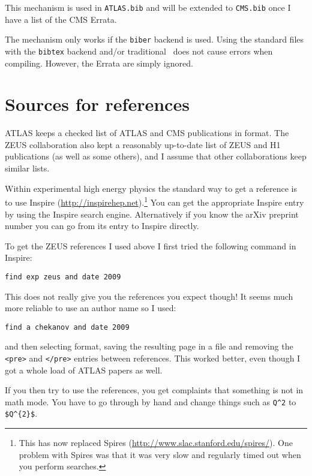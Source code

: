 This mechanism is used in \texttt{ATLAS.bib} and will be extended to \texttt{CMS.bib} once
I have a list of the CMS Errata.

The mechanism only works if the \texttt{biber} backend is used.
Using the standard files with the \texttt{bibtex} backend and/or traditional \BibTeX\ does not cause errors when compiling.
However, the Errata are simply ignored.


\section{Sources for references}
\label{sec:ref:sources}

ATLAS keeps a checked list of ATLAS and CMS publications in \BibTeX{} format. 
The ZEUS collaboration also kept a reasonably up-to-date list of ZEUS and
H1 publications (as well as some others),
and I assume that other collaborations keep similar lists.

Within experimental high energy physics the standard way to get a
reference is to use Inspire
(\url{http://inspirehep.net}).\footnote{This has now replaced Spires
(\url{http://www.slac.stanford.edu/spires/}).
One problem with Spires was that it was very slow and regularly
timed out when you perform searches.} You can get the appropriate
Inspire entry by using the Inspire search engine. Alternatively if you
know the arXiv preprint number you can go from its entry to Inspire
directly.

To get the ZEUS references I used above I first tried the following
command in Inspire:
\begin{verbatim}
find exp zeus and date 2009
\end{verbatim}
This does not really give you the references you expect though! It
seems much more reliable to use an author name so I used:
\begin{verbatim}
find a chekanov and date 2009
\end{verbatim}
and then selecting \BibTeX{} format, saving the resulting page in a file
and removing the \texttt{<pre>} and \texttt{</pre>} entries between
references. This worked better, even though I got a whole load of
ATLAS papers as well.

If you then try to use the references, you get complaints that
something is not in math mode. You have to go through by hand and
change things such as \verb+Q^2+ to \verb+$Q^{2}$+.


